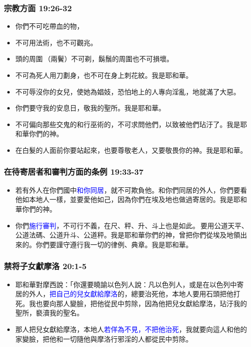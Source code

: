 \subsubsection{宗教方面 19:26-32}
\begin{itemize} 
\itemsep-.35em
\item 你們不可吃帶血的物，
\item 不可用法術，也不可觀兆。
\item 頭的周圍 （兩鬢）不可剃，鬍鬚的周圍也不可損壞。
\item 不可為死人用刀劃身，也不可在身上刺花紋。我是耶和華。
\item 不可辱沒你的女兒，使她為娼妓，恐怕地上的人專向淫亂，地就滿了大惡。
\item 你們要守我的安息日，敬我的聖所。我是耶和華。
\item 不可偏向那些交鬼的和行巫術的，不可求問他們，以致被他們玷汙了。我是耶和華你們的神。
\item 在白髮的人面前你要站起來，也要尊敬老人，又要敬畏你的神。我是耶和華。
\end{itemize}

\subsubsection{在待寄居者和審判方面的条例 19:33-37}
\begin{itemize} 
\itemsep-.35em
\item 若有外人在你們國中\textcolor{blue}{和你同居}，就不可欺負他。和你們同居的外人，你們要看他如本地人一樣，並要愛他如己，因為你們在埃及地也做過寄居的。我是耶和華你們的神。
\item 你們\textcolor{blue}{施行審判}，不可行不義，在尺、秤、升、斗上也是如此。 要用公道天平、公道法碼、公道升斗、公道秤。我是耶和華你們的神，曾把你們從埃及地領出來的。你們要謹守遵行我一切的律例、典章。我是耶和華。
\end{itemize}

\subsubsection{禁将子女獻摩洛 20:1-5}
\begin{itemize} 
\itemsep-.35em
\item 耶和華對摩西說：「你還要曉諭以色列人說：凡以色列人，或是在以色列中寄居的外人，\textcolor{blue}{把自己的兒女獻給摩洛}的，總要治死他，本地人要用石頭把他打死。我也要向那人變臉，把他從民中剪除，因為他把兒女獻給摩洛，玷汙我的聖所，褻瀆我的聖名。 
\item 那人把兒女獻給摩洛，本地人\textcolor{blue}{若佯為不見，不把他治死}，我就要向這人和他的家變臉，把他和一切隨他與摩洛行邪淫的人都從民中剪除。
\end{itemize}

